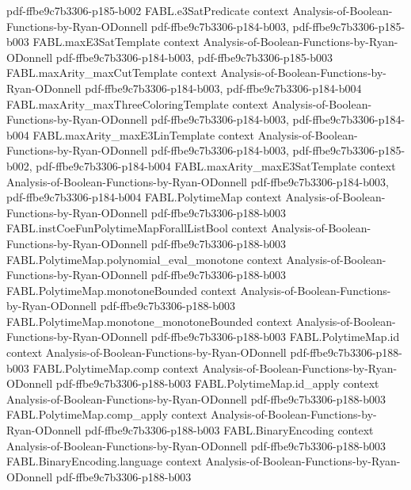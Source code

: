 \begin{theorem}
{    pdf-ffbe9c7b3306-p185-b002}
\proofstep
  {FABL.e3SatPredicate}
  {context}
  {Analysis-of-Boolean-Functions-by-Ryan-ODonnell}
  {pdf-ffbe9c7b3306-p184-b003,
    pdf-ffbe9c7b3306-p185-b003}
\proofstep
  {FABL.maxE3SatTemplate}
  {context}
  {Analysis-of-Boolean-Functions-by-Ryan-ODonnell}
  {pdf-ffbe9c7b3306-p184-b003,
    pdf-ffbe9c7b3306-p185-b003}
\proofstep
  {FABL.maxArity_maxCutTemplate}
  {context}
  {Analysis-of-Boolean-Functions-by-Ryan-ODonnell}
  {pdf-ffbe9c7b3306-p184-b003,
    pdf-ffbe9c7b3306-p184-b004}
\proofstep
  {FABL.maxArity_maxThreeColoringTemplate}
  {context}
  {Analysis-of-Boolean-Functions-by-Ryan-ODonnell}
  {pdf-ffbe9c7b3306-p184-b003,
    pdf-ffbe9c7b3306-p184-b004}
\proofstep
  {FABL.maxArity_maxE3LinTemplate}
  {context}
  {Analysis-of-Boolean-Functions-by-Ryan-ODonnell}
  {pdf-ffbe9c7b3306-p184-b003,
    pdf-ffbe9c7b3306-p185-b002,
    pdf-ffbe9c7b3306-p184-b004}
\proofstep
  {FABL.maxArity_maxE3SatTemplate}
  {context}
  {Analysis-of-Boolean-Functions-by-Ryan-ODonnell}
  {pdf-ffbe9c7b3306-p184-b003,
    pdf-ffbe9c7b3306-p184-b004}
\proofstep
  {FABL.PolytimeMap}
  {context}
  {Analysis-of-Boolean-Functions-by-Ryan-ODonnell}
  {pdf-ffbe9c7b3306-p188-b003}
\proofstep
  {FABL.instCoeFunPolytimeMapForallListBool}
  {context}
  {Analysis-of-Boolean-Functions-by-Ryan-ODonnell}
  {pdf-ffbe9c7b3306-p188-b003}
\proofstep
  {FABL.PolytimeMap.polynomial_eval_monotone}
  {context}
  {Analysis-of-Boolean-Functions-by-Ryan-ODonnell}
  {pdf-ffbe9c7b3306-p188-b003}
\proofstep
  {FABL.PolytimeMap.monotoneBounded}
  {context}
  {Analysis-of-Boolean-Functions-by-Ryan-ODonnell}
  {pdf-ffbe9c7b3306-p188-b003}
\proofstep
  {FABL.PolytimeMap.monotone_monotoneBounded}
  {context}
  {Analysis-of-Boolean-Functions-by-Ryan-ODonnell}
  {pdf-ffbe9c7b3306-p188-b003}
\proofstep
  {FABL.PolytimeMap.id}
  {context}
  {Analysis-of-Boolean-Functions-by-Ryan-ODonnell}
  {pdf-ffbe9c7b3306-p188-b003}
\proofstep
  {FABL.PolytimeMap.comp}
  {context}
  {Analysis-of-Boolean-Functions-by-Ryan-ODonnell}
  {pdf-ffbe9c7b3306-p188-b003}
\proofstep
  {FABL.PolytimeMap.id_apply}
  {context}
  {Analysis-of-Boolean-Functions-by-Ryan-ODonnell}
  {pdf-ffbe9c7b3306-p188-b003}
\proofstep
  {FABL.PolytimeMap.comp_apply}
  {context}
  {Analysis-of-Boolean-Functions-by-Ryan-ODonnell}
  {pdf-ffbe9c7b3306-p188-b003}
\proofstep
  {FABL.BinaryEncoding}
  {context}
  {Analysis-of-Boolean-Functions-by-Ryan-ODonnell}
  {pdf-ffbe9c7b3306-p188-b003}
\proofstep
  {FABL.BinaryEncoding.language}
  {context}
  {Analysis-of-Boolean-Functions-by-Ryan-ODonnell}
  {pdf-ffbe9c7b3306-p188-b003}

\end{theorem}
